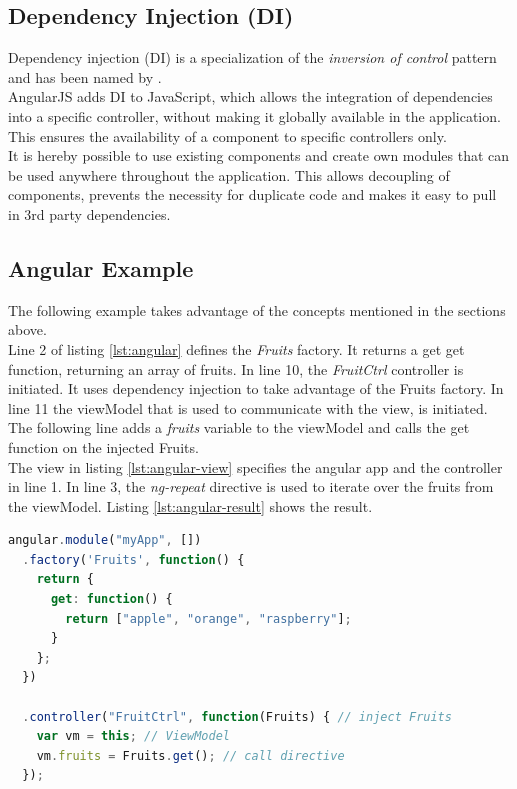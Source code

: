 \subsection{Dependency Injection (DI)}
Dependency injection (DI) is a specialization of the \textit{inversion of control} pattern and has been named by \cite{fowler2004inversion}. \\
AngularJS adds DI to JavaScript, which allows the integration of dependencies into a specific controller, without making it globally available in the application. This ensures the availability of a component to specific controllers only.\\
It is hereby possible to use existing components and create own modules that can be used anywhere throughout the application. This allows decoupling of components, prevents the necessity for duplicate code and makes it easy to pull in 3rd party dependencies. 


\subsection{Angular Example}
The following example takes advantage of the concepts mentioned in the sections above. \\
Line 2 of listing \ref{lst:angular} defines the \textit{Fruits} factory. It returns a get get function, returning an array of fruits. In line 10, the \textit{FruitCtrl} controller is initiated. It uses dependency injection to take advantage of the Fruits factory. In line 11 the viewModel that is used to communicate with the view, is initiated. The following line adds a \textit{fruits} variable to the viewModel and calls the get function on the injected Fruits.\\
The view in listing \ref{lst:angular-view} specifies the angular app and the controller in line 1. In line 3, the \textit{ng-repeat} directive is used to iterate over the fruits from the viewModel. Listing \ref{lst:angular-result} shows the result.

\begin{lstlisting}[language=javascript, caption=AngularJS directive and controller definition, label=lst:angular]
angular.module("myApp", [])
  .factory('Fruits', function() {
    return {
      get: function() {
        return ["apple", "orange", "raspberry"];
      }
    };
  })
  
  .controller("FruitCtrl", function(Fruits) { // inject Fruits
    var vm = this; // ViewModel
    vm.fruits = Fruits.get(); // call directive
  });
\end{lstlisting}


